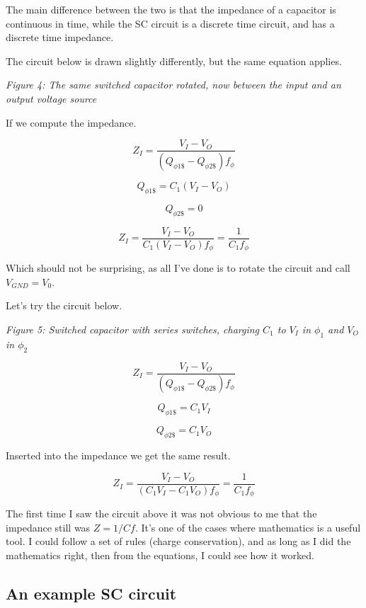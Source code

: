 The main difference between the two is that the impedance of a capacitor
is continuous in time, while the SC circuit is a discrete time circuit,
and has a discrete time impedance.

The circuit below is drawn slightly differently, but the same equation
applies.


{
\centering
{}
}

\emph{Figure 4: The same switched capacitor rotated, now between the
input and an output voltage source}

If we compute the impedance.

\[ Z_{I} = \frac{V_{I} - V_{O}}{\left(Q_{\phi1\$} - Q_{\phi2\$}\right) f_{\phi}}\]

\[ Q_{\phi1\$} = C_1 (V_I - V_O)\]

\[ Q_{\phi2\$} = 0 \]

\[ Z_{I} = \frac{V_{I} - V_{O}}{C_1 \left(V_I - V_O\right) f_{\phi}} = \frac{1}{C_1 f_\phi}\]

Which should not be surprising, as all I've done is to rotate the
circuit and call \(V_{GND} = V_0\).

Let's try the circuit below.


{
\centering
{}
}

\emph{Figure 5: Switched capacitor with series switches, charging
\(C_1\) to \(V_I\) in \(\phi_1\) and \(V_O\) in \(\phi_2\)}

\[ Z_{I} = \frac{ V_{I} - V_{O} }{ \left(Q_{\phi1\$} - Q_{\phi2\$}\right) f_{\phi}}\]

\[ Q_{\phi1\$} = C_1 V_I\]

\[ Q_{\phi2\$} = C_1 V_O \]

Inserted into the impedance we get the same result.

\[ Z_{I} = \frac{V_{I} - V_{O}}{\left(C_1 V_I - C_1 V_O\right) f_{\phi}} = \frac{1}{C_1 f_\phi}\]

The first time I saw the circuit above it was not obvious to me that the
impedance still was \(Z = 1/Cf\). It's one of the cases where
mathematics is a useful tool. I could follow a set of rules (charge
conservation), and as long as I did the mathematics right, then from the
equations, I could see how it worked.

\subsection{An example SC circuit}\label{an-example-sc-circuit}

